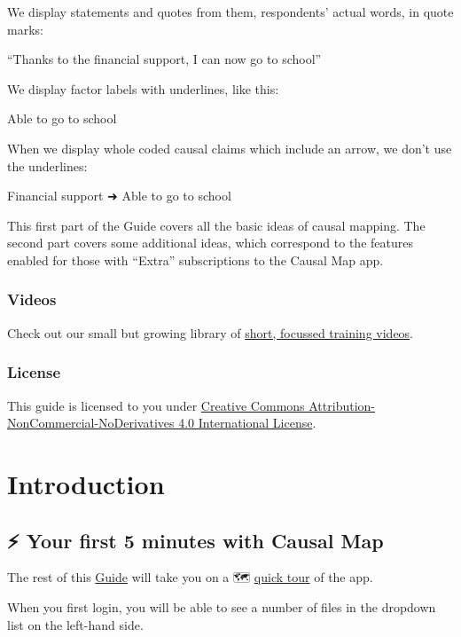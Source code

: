 \documentclass[
]{book}
\begin{document}
We display statements and quotes from them, respondents' actual words, in quote marks:

``Thanks to the financial support, I can now go to school''

We display factor labels with underlines, like this:

Able to go to school

When we display whole coded causal claims which include an arrow, we don't use the underlines:

Financial support ➜ Able to go to school

This first part of the Guide covers all the basic ideas of causal mapping. The second part covers some additional ideas, which correspond to the features enabled for those with ``Extra'' subscriptions to the Causal Map app.

\hypertarget{videos}{%
\section{Videos}\label{videos}}

Check out our small but growing library of \href{https://causalmap.app/course/causal-map-basics/}{short, focussed training videos}.

\hypertarget{license}{%
\section*{License}\label{license}}

This guide is licensed to you under \href{http://creativecommons.org/licenses/by-nc-nd/4.0/}{Creative Commons Attribution-NonCommercial-NoDerivatives 4.0 International License}.

\hypertarget{part-introduction}{%
\part{Introduction}\label{part-introduction}}

\hypertarget{x5}{%
\chapter{⚡ Your first 5 minutes with Causal Map}\label{x5}}

The rest of this \href{guide.causalmap.app}{Guide} will take you on a 🗺 \protect\hyperlink{quick-tour}{quick tour} of the app.

When you first login, you will be able to see a number of files in the dropdown list on the left-hand side.
\end{document}
